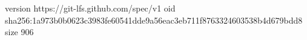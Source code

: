 version https://git-lfs.github.com/spec/v1
oid sha256:1a973b0b0623c3983fe60541dde9a56eac3eb711f8763324603538b4d679bdd8
size 906
